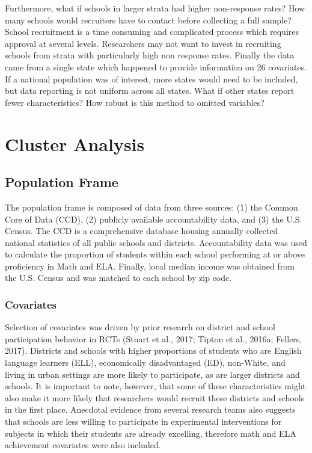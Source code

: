 \documentclass[man]{apa6}
\begin{document}
Furthermore, what if schools in larger strata had higher non-response rates? How many schools would recruiters have to contact before collecting a full sample? School recruitment is a time consuming and complicated process which requires approval at several levels. Researchers may not want to invest in recruiting schools from strata with particularly high non response rates. Finally the data came from a single state which happened to provide information on 26 covariates. If a national population was of interest, more states would need to be included, but data reporting is not uniform across all states. What if other states report fewer characteristics? How robust is this method to omitted variables?

\hypertarget{cluster-analysis}{%
\section{Cluster Analysis}\label{cluster-analysis}}

\hypertarget{population-frame}{%
\subsection{Population Frame}\label{population-frame}}

The population frame is composed of data from three sources: (1) the Common Core of Data (CCD), (2) publicly available accountability data, and (3) the U.S. Census. The CCD is a comprehensive database housing annually collected national statistics of all public schools and districts. Accountability data was used to calculate the proportion of students within each school performing at or above proficiency in Math and ELA. Finally, local median income was obtained from the U.S. Census and was matched to each school by zip code.

\hypertarget{covariates}{%
\subsubsection{Covariates}\label{covariates}}

Selection of covariates was driven by prior research on district and school participation behavior in RCTs (Stuart et al., 2017; Tipton et al., 2016a; Fellers, 2017). Districts and schools with higher proportions of students who are English language learners (ELL), economically disadvantaged (ED), non-White, and living in urban settings are more likely to participate, as are larger districts and schools. It is important to note, however, that some of these characteristics might also make it more likely that researchers would recruit these districts and schools in the first place. Anecdotal evidence from several research teams also suggests that schools are less willing to participate in experimental interventions for subjects in which their students are already excelling, therefore math and ELA achievement covariates were also included.
\end{document}
